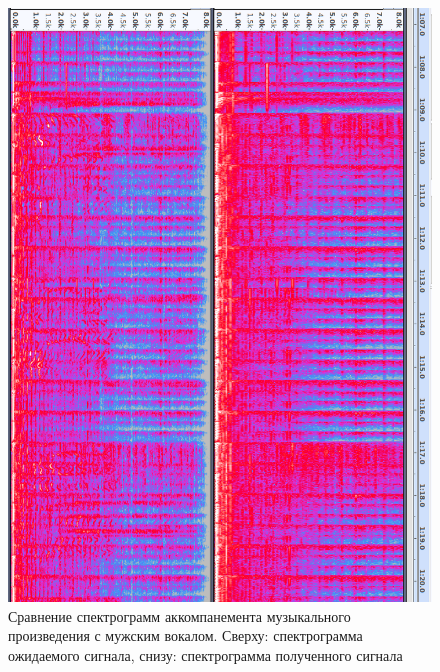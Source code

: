 \begin{figure}
	\centering
	\includegraphics[width=0.9\linewidth]{inc/img/spec-music-male}
	\caption{Сравнение спектрограмм аккомпанемента музыкального произведения с мужским вокалом. Сверху: спектрограмма ожидаемого сигнала, снизу: спектрограмма полученного сигнала}
	\label{res:malemusic}
\end{figure}

